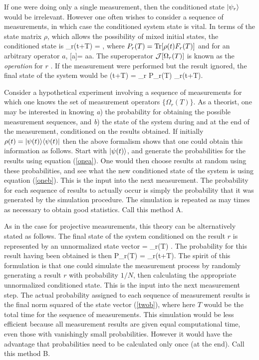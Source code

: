 If one were doing only a single measurement, then the conditioned state
$| {\psi_r} \rangle$ would be irrelevant. However one often wishes to consider
a sequence of measurements, in which case the conditioned system state is vital. In
terms of the state matrix $\rho$, which allows the possibility of mixed initial
states, the conditioned state is 
\beq \rho_r(t+T) = , \eeq 
where $P_r(T)={\rm Tr}[\rho(t)F_r(T)]$ and for an arbitrary operator $a$, 
[a]\rho = a\rho a\dg. \label{defcalJ}
\eeq
The superoperator ${\cal J}[\Omega_r(T)]$ is known as the {\em operation} for $r$
\cite{Dav76}. If the measurement were performed but the result ignored, the final
state of the system would be
\beq \label{rop}
\rho(t+T) = \sum_r P_r(T) \rho_r(t+T).
\eeq

Consider a hypothetical experiment involving a sequence of
measurements for which one knows the set of measurement operators $\{\Omega_r(T)\}$.
As a theorist, one may be interested in knowing {\em a}) the probability for
obtaining the possible measurement sequences, and {\em b}) the state of the system
during and at the end of the measurement, conditioned on the results obtained. If
initially $\rho(t)=| {\psi(t)} \rangle\langle {\psi(t)} |$ then the above formalism shows that
one could obtain this information as follows. Start with $| {\psi(t)} \rangle$, and generate
the probabilities for the results using equation (\ref{onea}). One would then choose
results at random using these probabilities, and see what the new conditioned state
of the system is using equation (\ref{oneb}). This is the input into the next
measurement. The probability for each sequence of results to actually occur is
simply the probability that it was generated by the simulation procedure. The
simulation is repeated as may times as necessary to obtain good statistics. Call
this method A.

As in the case for projective measurements, this theory can be alternatively
stated as follows. The final state of the system conditioned on the result $r$ is
represented by an unnormalized state vector
 \beq \label{twoa}
 = \Omega_r(T) .
\eeq
The probability for this result having been obtained is  then
\beq \label{twob}
P_r(T) = \tilde{\psi}_r(t+T)\rangle.
\eeq
The spirit of this formulation is that one could simulate the measurement process
by randomly generating a result $r$ with probability $1/N$, then calculating
the appropriate unnormalized conditioned state. This is the input into the next
measurement step. The actual probability assigned to each sequence of measurement
results is the final norm squared of the state vector (\ref{twob}), where here
 $T$ would be the total time for the sequence of measurements.
This simulation would be less efficient because all measurement results are given
equal computational time, even those with vanishingly small probabilities. However
it would have the advantage that probabilities need to be calculated only once (at
the end). Call this method B.

